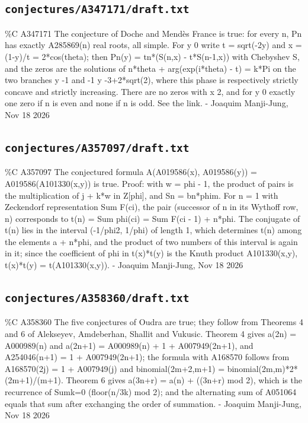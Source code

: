 \subsection*{\texttt{conjectures/A347171/draft.txt}}
{\small\raggedright\ttfamily
\%C A347171 The conjecture of Doche and Mendès France is true: for every n, Pn has exactly A285869(n) real roots, all simple. For y  0 write t = sqrt(-2y) and x = (1-y)/t = 2*cos(theta); then Pn(y) = tn*(S(n,x) - t*S(n-1,x)) with Chebyshev S, and the zeros are the solutions of n*theta + arg(exp(i*theta) - t) = k*Pi on the two branches y  -1 and -1  y  -3+2*sqrt(2), where this phase is respectively strictly concave and strictly increasing. There are no zeros with x  2, and for y  0 exactly one zero if n is even and none if n is odd. See the link. - Joaquim Manji-Jung, Nov 18 2026\par
}
\subsection*{\texttt{conjectures/A357097/draft.txt}}
{\small\raggedright\ttfamily
\%C A357097 The conjectured formula A(A019586(x), A019586(y)) = A019586(A101330(x,y)) is true. Proof: with w = phi - 1, the product of pairs is the multiplication of j + k*w in Z[phi], and Sn = bn*phim. For n = 1 with Zeckendorf representation Sum F(ci), the pair (successor of n in its Wythoff row, n) corresponds to t(n) = Sum phi(ci) = Sum F(ci - 1) + n*phi. The conjugate of t(n) lies in the interval (-1/phi2, 1/phi) of length 1, which determines t(n) among the elements a + n*phi, and the product of two numbers of this interval is again in it; since the coefficient of phi in t(x)*t(y) is the Knuth product A101330(x,y), t(x)*t(y) = t(A101330(x,y)). - Joaquim Manji-Jung, Nov 18 2026\par
}
\subsection*{\texttt{conjectures/A358360/draft.txt}}
{\small\raggedright\ttfamily
\%C A358360 The five conjectures of Oudra are true; they follow from Theorems 4 and 6 of Alekseyev, Amdeberhan, Shallit and Vukusic. Theorem 4 gives a(2n) = A000989(n) and a(2n+1) = A000989(n) + 1 + A007949(2n+1), and A254046(n+1) = 1 + A007949(2n+1); the formula with A168570 follows from A168570(2j) = 1 + A007949(j) and binomial(2m+2,m+1) = binomial(2m,m)*2*(2m+1)/(m+1). Theorem 6 gives a(3n+r) = a(n) + ((3n+r) mod 2), which is the recurrence of Sumk=0 (floor(n/3k) mod 2); and the alternating sum of A051064 equals that sum after exchanging the order of summation. - Joaquim Manji-Jung, Nov 18 2026\par
}
